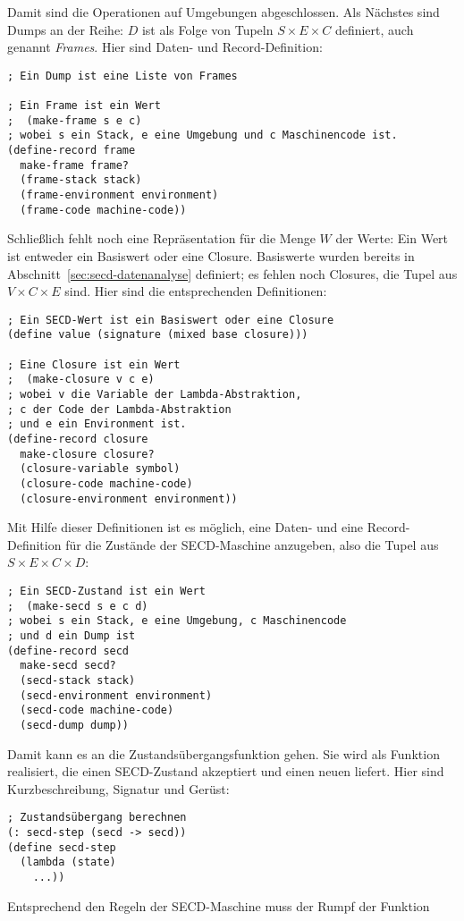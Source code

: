 %
Damit sind die Operationen auf Umgebungen abgeschlossen.  Als Nächstes
sind Dumps an der Reihe: $D$ ist als Folge von Tupeln $S\times E\times
C$ definiert, auch genannt \textit{Frames}.  Hier sind
Daten- und Record-Definition:
%
\begin{lstlisting}
; Ein Dump ist eine Liste von Frames

; Ein Frame ist ein Wert
;  (make-frame s e c)
; wobei s ein Stack, e eine Umgebung und c Maschinencode ist.
(define-record frame
  make-frame frame?
  (frame-stack stack)
  (frame-environment environment)
  (frame-code machine-code))
\end{lstlisting}
%
Schließlich fehlt noch eine Repräsentation für die Menge $W$ der
Werte:  Ein Wert ist entweder ein Basiswert oder eine Closure.
Basiswerte wurden bereits in Abschnitt~\ref{sec:secd-datenanalyse}
definiert; es fehlen noch Closures, die Tupel aus $V\times C\times E$
sind.  Hier sind die entsprechenden Definitionen:
%
\begin{lstlisting}
; Ein SECD-Wert ist ein Basiswert oder eine Closure
(define value (signature (mixed base closure)))

; Eine Closure ist ein Wert
;  (make-closure v c e)
; wobei v die Variable der Lambda-Abstraktion,
; c der Code der Lambda-Abstraktion
; und e ein Environment ist.
(define-record closure
  make-closure closure?
  (closure-variable symbol)
  (closure-code machine-code)
  (closure-environment environment))
\end{lstlisting}
%
Mit Hilfe dieser Definitionen ist es möglich, eine Daten- und eine
Record-Definition für die Zustände der SECD-Maschine anzugeben, also
die Tupel aus $S\times E\times C\times D$:
%
\begin{lstlisting}
; Ein SECD-Zustand ist ein Wert
;  (make-secd s e c d)
; wobei s ein Stack, e eine Umgebung, c Maschinencode
; und d ein Dump ist
(define-record secd
  make-secd secd?
  (secd-stack stack)
  (secd-environment environment)
  (secd-code machine-code)
  (secd-dump dump))
\end{lstlisting}
%
Damit kann es an die Zustandsübergangsfunktion gehen.   Sie wird als
Funktion realisiert, die einen SECD-Zustand akzeptiert und einen neuen
liefert.  Hier sind Kurzbeschreibung, Signatur und Gerüst:
%
\begin{lstlisting}
; Zustandsübergang berechnen
(: secd-step (secd -> secd))
(define secd-step
  (lambda (state)
    ...))
\end{lstlisting}
%
Entsprechend den Regeln der SECD-Maschine muss der Rumpf der Funktion

